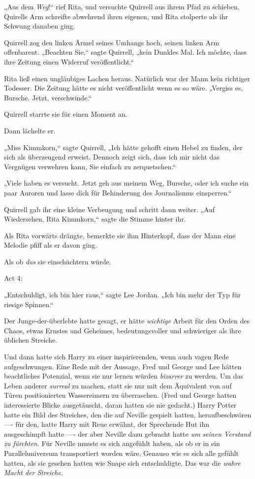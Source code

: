 {„Aus dem \emph{Weg}!“ rief Rita, und versuchte Quirrell aus ihrem Pfad zu schieben. Quirells Arm schreifte abwehrend ihren eigenen, und Rita stolperte als ihr Schwung danaben ging.

Quirrell zog den linken Ärmel seines Umhangs hoch, seinen linken Arm offenbarent. „Beachten Sie,“ sagte Quirrell, „kein Dunkles Mal. Ich möchte, dass ihre Zeitung einen Widerruf veröffentlicht.“

Rita ließ einen ungläubiges Lachen heraus. Natürlich war der Mann kein richtiger Todesser. Die Zeitung hätte es nicht veröffentlicht wenn es so wäre. „Vergiss es, Bursche. Jetzt, verschwinde.“

Quirrell starrte sie für einen Moment an.

Dann lächelte er.

„Miss Kimmkorn,“ sagte Quirrell, „Ich hätte gehofft einen Hebel zu finden, der sich als überzeugend erweist. Dennoch zeigt sich, dass ich mir nicht das Vergnügen verwehren kann, Sie einfach zu zerquetschen.“

„Viele haben es versucht. Jetzt geh aus meinem Weg, Bursche, oder ich suche ein paar Auroren und lasse dich für Behinderung des Journalismus einsperren.“

Quirrell gab ihr eine kleine Verbeugung und schritt dann weiter. „Auf Wiedersehen, Rita Kimmkorn,“ sagte die Stimme hinter ihr.

Als Rita vorwärts drängte, bemerkte sie ihm Hinterkopf, dass der Mann eine Melodie pfiff als er davon ging.

Als ob \emph{das} sie einschüchtern würde.

Act 4:

„Entschuldigt, ich bin hier raus,“ sagte Lee Jordan. „Ich bin mehr der Typ für riesige Spinnen.“

Der Junge-der-überlebte hatte gesagt, er hätte \emph{wichtige} Arbeit für den Orden des Chaos, etwas Ernstes und Geheimes, bedeutungsvoller und schwieriger als ihre üblichen Streiche.

Und dann hatte sich Harry zu einer inspirierenden, wenn auch vagen Rede aufgeschwungen. Eine Rede mit der Aussage, Fred und George und Lee hätten beachtliches Potenzial, wenn sie nur lernen würden \emph{bizarrer} zu werden. Um das Leben anderer \emph{surreal} zu machen, statt sie nur mit dem Äquivalent von auf Türen positionierten Wassereimern zu überraschen. (Fred und George hatten interessierte Blicke ausgetäuscht, daran hatten sie nie gedacht.) Harry Potter hatte ein Bild des Streiches, den die auf Neville gespielt hatten, heraufbeschwören ---- für den, hatte Harry mit Reue erwähnt, der Sprechende Hut ihn ausgeschimpft hatte ---- der aber Neville dazu gebracht hatte \emph{um seinen Verstand zu fürchten}. Für Neville musste es sich angefühlt haben, als ob er in ein Paralleluniversum transportiert worden wäre. Genauso wie es sich alle gefühlt hatten, als sie gesehen hatten wie Snape sich entschuldigte. Das war die \emph{wahre Macht der Streiche.}

}
